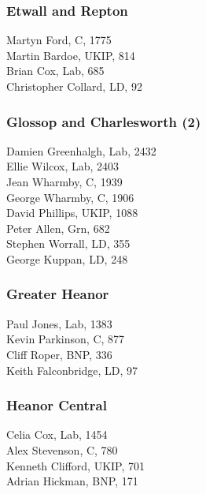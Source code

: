 \documentclass[a4paper,openany,10pt]{book}
\begin{document}
\subsubsection*{Etwall and Repton}



Martyn Ford, C, 1775\\
Martin Bardoe, UKIP, 814\\
Brian Cox, Lab, 685\\
Christopher Collard, LD, 92\\


\subsubsection*{Glossop and Charlesworth (2)}



Damien Greenhalgh, Lab, 2432\\
Ellie Wilcox, Lab, 2403\\
Jean Wharmby, C, 1939\\
George Wharmby, C, 1906\\
David Phillips, UKIP, 1088\\
Peter Allen, Grn, 682\\
Stephen Worrall, LD, 355\\
George Kuppan, LD, 248\\


\subsubsection*{Greater Heanor}



Paul Jones, Lab, 1383\\
Kevin Parkinson, C, 877\\
Cliff Roper, BNP, 336\\
Keith Falconbridge, LD, 97\\


\subsubsection*{Heanor Central}



Celia Cox, Lab, 1454\\
Alex Stevenson, C, 780\\
Kenneth Clifford, UKIP, 701\\
Adrian Hickman, BNP, 171\\
\end{document}
